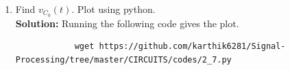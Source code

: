 \documentclass[journal,12pt,twocolumn]{IEEEtran}
\newcommand{\solution}{\noindent \textbf{Solution: }}
\providecommand{\brak}[1]{\ensuremath{\left(#1\right)}}
\providecommand{\system}[1]{\overset{\mathcal{#1}}{ \longleftrightarrow}}
\numberwithin{equation}{section}
\renewcommand\thesection{\arabic{section}}
\begin{document}
\begin{enumerate}[label=\arabic*.,ref=\thesection.\theenumi]
\begin{figure}[!ht]
			\caption{}
			\label{fig:lap-ckt}
		\end{figure}
		where 
		\begin{align}
			u(t) \system{L} V_1(s)
			\\
			2u(t) \system{L} V_2(s)
		\end{align}
		Find the voltage across the capacitor $V_{C_0}(s)$.\\
		\solution
		\begin{align}
			R_{eff}=\frac{1}{1+\frac{1}{2}}
			=\frac{2}{3} \Omega\\
			V_{eff}=\frac{1}{1+\frac{1}{2}}
			=\frac{2}{3}V
		\end{align}
		\begin{align}
			V_{C_0}(s)&=V_{S}(s)\frac{C_{0}}{C_{0}+R_{eff}}\\
			&=\brak{\frac{4}{3s}}\brak{\frac{\frac{1}{s}}{\frac{1}{s}+\frac{2}{3}}}\\
			\label{eq:laptr}
			&=\frac{3+4s}{3s\brak{s+\frac{3}{2}}}
		\end{align}
		\item Find $v_{C_0}(t)$.  Plot using python.\\
		\solution Running the following code gives the plot.
		\begin{lstlisting}
			wget https://github.com/karthik6281/Signal-Processing/tree/master/CIRCUITS/codes/2_7.py
		\end{lstlisting}
		

\end{enumerate}
\end{document}
